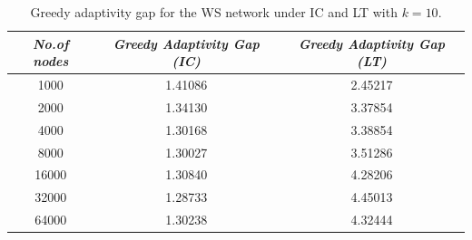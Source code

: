  \begin{table} [ht]
    \centering
    \begin{adjustbox}{width=1\textwidth}
    \begin{tabular}{ | c | c | c | }
    \hline
    \textit{No.of nodes}& \textit{Greedy Adaptivity Gap (IC)}& \textit{Greedy Adaptivity Gap (LT)}\\[2ex]
     \hline
    1000& 1.41086& 2.45217\\ [2ex]
    2000& 1.34130& 3.37854\\[2ex]
    4000& 1.30168& 3.38854\\[2ex]
    8000& 1.30027& 3.51286\\[2ex]
    16000& 1.30840& 4.28206\\[2ex]
    32000& 1.28733& 4.45013\\[2ex]
    64000& 1.30238& 4.32444\\[2ex]
    \hline
    \end{tabular}
    \end{adjustbox}
    \caption{Greedy adaptivity gap for the WS network under IC and LT with $k=10$.}
    \label{WS}
    \end{table}



